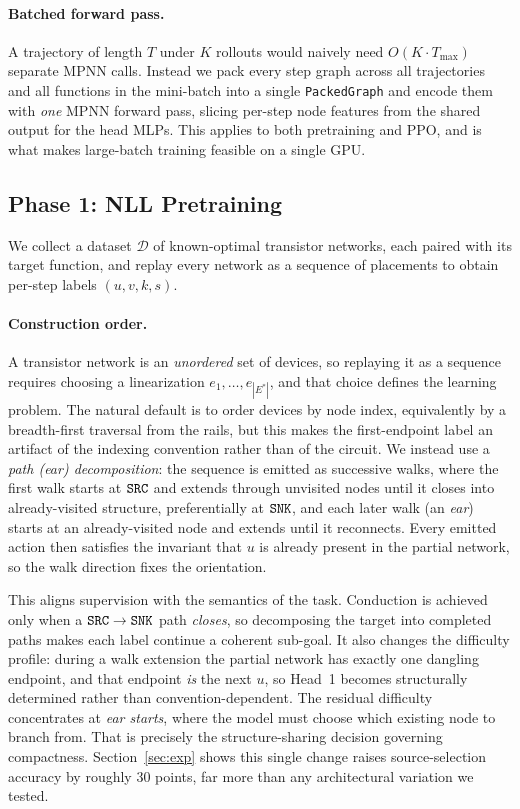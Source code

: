 \paragraph{Batched forward pass.}
A trajectory of length $T$ under $K$ rollouts would naively need
$O(K \cdot T_{\max})$ separate MPNN calls.
Instead we pack every step graph across all trajectories and all functions in
the mini-batch into a single \texttt{PackedGraph} and encode them with
\emph{one} MPNN forward pass, slicing per-step node features from the shared
output for the head MLPs.
This applies to both pretraining and PPO, and is what makes large-batch
training feasible on a single GPU.



\subsection{Phase 1: NLL Pretraining}
\label{sec:pretrain}

We collect a dataset $\mathcal{D}$ of known-optimal transistor networks, each
paired with its target function, and replay every network as a sequence of
placements to obtain per-step labels $(u, v, k, s)$.

\paragraph{Construction order.}
\label{par:order}
A transistor network is an \emph{unordered} set of devices, so replaying it as
a sequence requires choosing a linearization $e_1, \dots, e_{|E^*|}$, and that
choice defines the learning problem.
The natural default is to order devices by node index, equivalently by a
breadth-first traversal from the rails, but this makes the first-endpoint
label an artifact of the indexing convention rather than of the circuit.
We instead use a \emph{path (ear) decomposition}: the sequence is emitted as
successive walks, where the first walk starts at $\texttt{SRC}$ and extends through
unvisited nodes until it closes into already-visited structure, preferentially
at $\texttt{SNK}$, and each later walk (an \emph{ear}) starts at an already-visited
node and extends until it reconnects.
Every emitted action then satisfies the invariant that $u$ is already present
in the partial network, so the walk direction fixes the orientation.

This aligns supervision with the semantics of the task.  Conduction is
achieved only when a $\texttt{SRC} \to \texttt{SNK}$ path \emph{closes}, so decomposing the
target into completed paths makes each label continue a coherent sub-goal.
It also changes the difficulty profile: during a walk extension the partial
network has exactly one dangling endpoint, and that endpoint \emph{is} the
next $u$, so Head~1 becomes structurally determined rather than convention-dependent.
The residual difficulty concentrates at \emph{ear starts}, where the model
must choose which existing node to branch from.  That is precisely the
structure-sharing decision governing compactness.
Section~\ref{sec:exp} shows this single change raises source-selection
accuracy by roughly $30$ points, far more than any architectural variation we
tested.


